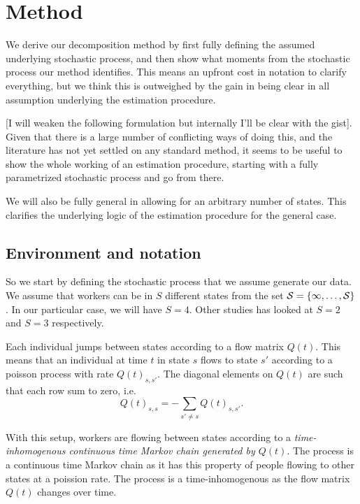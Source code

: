\section{Method}
We derive our decomposition method by first fully defining the assumed underlying stochastic process, and then show what moments from the stochastic process our method identifies.
This means an upfront cost in notation to clarify everything, but we think this is outweighed by the gain in being clear in all assumption underlying the estimation procedure.

[I will weaken the following formulation but internally I'll be clear with the gist]. Given that there is a large number of conflicting ways of doing this, and the literature has not yet settled on any standard method, it seems to be useful to show the whole working of an estimation procedure, starting with a fully parametrized stochastic process and go from there.

We will also be fully general in allowing for an arbitrary number of states. This clarifies the underlying logic of the estimation procedure for the general case.

\subsection{Environment and notation}
So we start by defining the stochastic process that we assume generate our data. We assume that workers can be in $S$ different states from the set $\cal S = \{1,\dots,S\}$. In our particular case, we will have $S=4$. Other studies has looked at $S=2$ and $S=3$ respectively.

Each individual jumps between states according to a flow matrix $Q(t)$. This means that an individual at time $t$ in state $s$ flows to state $s'$ according to a poisson process with rate $Q(t)_{s,s'}$. The diagonal elements on $Q(t)$ are such that each row sum to zero, i.e.
\[
	Q(t)_{s,s} = -\sum_{s' \neq s} Q(t)_{s,s'}.
\]

With this setup, workers are flowing between states according to a \emph{time-inhomogenous continuous time Markov chain generated by $Q(t)$}. The process is a continuous time Markov chain as it has this property of people flowing to other states at a poission rate. The process is a time-inhomogenous as the flow matrix $Q(t)$ changes over time.

